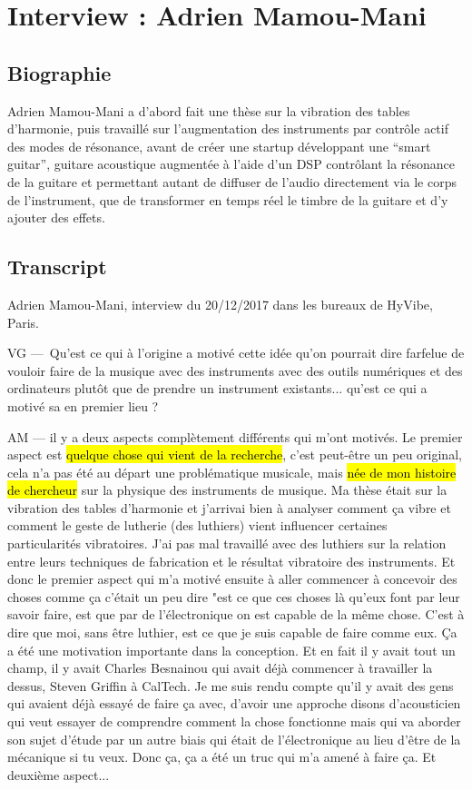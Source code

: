 \chapter{Interview : Adrien Mamou-Mani}
\label{appendix:mamou-mani}

\section*{Biographie}

\noindent Adrien Mamou-Mani a d'abord fait une thèse sur la vibration des tables d'harmonie, puis travaillé sur l'augmentation des instruments par contrôle actif des modes de résonance, avant de créer une startup développant une ``smart guitar'', guitare acoustique augmentée à l'aide d'un DSP contrôlant la résonance de la guitare et permettant autant de diffuser de l'audio directement via le corps de l'instrument, que de transformer en temps réel le timbre de la guitare et d'y ajouter des effets.

\section*{Transcript}

\noindent Adrien Mamou-Mani, interview du 20/12/2017 dans les bureaux de HyVibe, Paris.

VG — Qu'est ce qui à l'origine a motivé cette idée qu'on pourrait dire farfelue de vouloir faire de la musique avec des instruments avec des outils numériques et des ordinateurs plutôt que de prendre un instrument existants... qu'est ce qui a motivé sa en premier lieu ?


AM — il y a deux aspects complètement différents qui m'ont motivés. Le premier aspect est \hl{quelque chose qui vient de la recherche}, c'est peut-être un peu original, cela n'a pas été au départ une problématique musicale, mais \hl{née de mon histoire de chercheur} sur la physique des instruments de musique. Ma thèse était sur la vibration des tables d'harmonie et j'arrivai bien à analyser comment ça vibre et comment le geste de lutherie (des luthiers) vient influencer certaines particularités vibratoires. J'ai pas mal travaillé avec des luthiers sur la relation entre leurs techniques de fabrication et le résultat vibratoire des instruments.
Et donc le premier aspect qui m'a motivé ensuite à aller commencer à concevoir des choses comme ça c'était un peu dire "est ce que ces choses là qu'eux font par leur savoir faire, est que par de l'électronique on est capable de la même chose. C'est à dire que moi, sans être luthier, est ce que je suis capable de faire comme eux. Ça a été une motivation importante dans la conception. Et en fait il y avait tout un champ, il y avait Charles Besnainou qui avait déjà commencer à travailler la dessus, Steven Griffin à CalTech. 
Je me suis rendu compte qu'il y avait des gens qui avaient déjà essayé de faire ça avec, d'avoir une approche disons d'acousticien qui veut essayer de comprendre comment la chose fonctionne mais qui va aborder son sujet d'étude par un autre biais qui était de l'électronique au lieu d'être de la mécanique si tu veux. 
Donc ça, ça a été un truc qui m'a amené à faire ça. Et deuxième aspect... 

